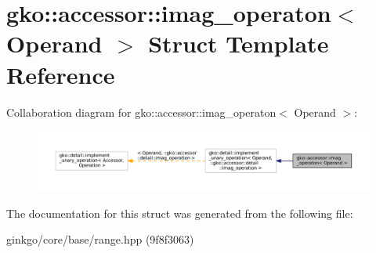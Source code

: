 \hypertarget{structgko_1_1accessor_1_1imag__operaton}{}\section{gko\+:\+:accessor\+:\+:imag\+\_\+operaton$<$ Operand $>$ Struct Template Reference}
\label{structgko_1_1accessor_1_1imag__operaton}


Collaboration diagram for gko\+:\+:accessor\+:\+:imag\+\_\+operaton$<$ Operand $>$\+:
\nopagebreak
\begin{figure}[H]
\begin{center}
\leavevmode
\includegraphics[width=350pt]{structgko_1_1accessor_1_1imag__operaton__coll__graph}
\end{center}
\end{figure}


The documentation for this struct was generated from the following file\+:\begin{DoxyCompactItemize}
\item 
ginkgo/core/base/range.\+hpp (9f8f3063)\end{DoxyCompactItemize}
